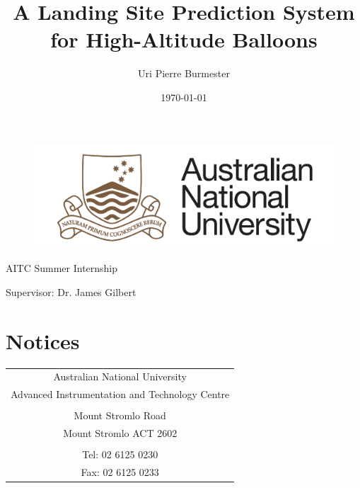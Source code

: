 \documentclass[11pt]{article}
\title{A Landing Site Prediction System for High-Altitude Balloons \large}
\author{Uri Pierre Burmester}
\date{\today}
\begin{document}
\begin{figure} \centering
  \includegraphics[width=0.5\linewidth]{ANU.png}
\end{figure}

\maketitle

\centerline{AITC Summer Internship}  
\centerline{Supervisor: Dr. James Gilbert} 

\newpage

\section{Notices}

\begin{table}[!h] \centering 
 \begin{tabular}{|c|} 
 \hline

Australian National University \\ 
Advanced Instrumentation and Technology Centre \\

 \\

Mount Stromlo Road \\ 
Mount Stromlo ACT 2602 \\

 \\

Tel: 	02 6125 0230 \\
Fax:	02 6125 0233 \\

   \hline
   \end{tabular}
\end{table}
\end{document}
